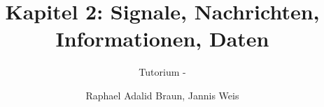 \documentclass[18pt]{beamer}
\title[Signale, Nachrichten...]{Kapitel 2: Signale, Nachrichten, Informationen, Daten}
\subtitle{Tutorium - } %
\author{Raphael Adalid Braun, Jannis Weis}
\institute{Grundbegriffe der Informatik | WS 2018/19}
\begin{document}

\begin{frame}
	\titlepage
\end{frame}

\title[Signale]{}

\end{document}
